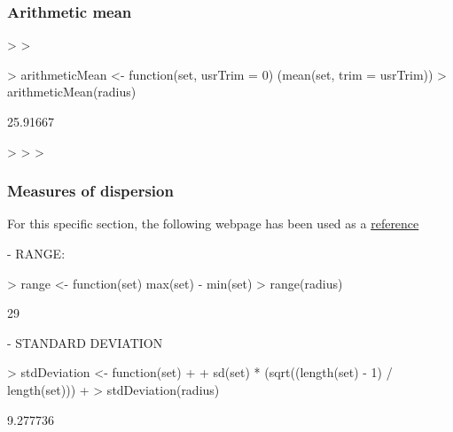 \documentclass[a4paper]{article}
\begin{document}
\subsubsection*{Arithmetic mean}

\begin{Schunk}
\begin{Sinput}
> 
> 
\end{Sinput}
\end{Schunk}
\begin{Schunk}
\begin{Sinput}
> arithmeticMean <- function(set, usrTrim = 0) (mean(set, trim = usrTrim))
> arithmeticMean(radius)
\end{Sinput}
\begin{Soutput}
[1] 25.91667
\end{Soutput}
\begin{Sinput}
> 
> 
> 
\end{Sinput}
\end{Schunk}








\subsubsection*{Measures of dispersion}

For this specific section, the following webpage has been used as a \href{http://iridl.ldeo.columbia.edu/dochelp/StatTutorial/Dispersion/index.html#Intro}{reference}

- RANGE:

\begin{Schunk}
\begin{Sinput}
> range <- function(set) {max(set) - min(set)}
> range(radius)
\end{Sinput}
\begin{Soutput}
[1] 29
\end{Soutput}
\end{Schunk}

- STANDARD DEVIATION
\begin{Schunk}
\begin{Sinput}
> stdDeviation <- function(set)
+ {
+ sd(set) * (sqrt((length(set) - 1) / length(set)))
+ }
> stdDeviation(radius)
\end{Sinput}
\begin{Soutput}
[1] 9.277736
\end{Soutput}
\end{Schunk}
\end{document}
